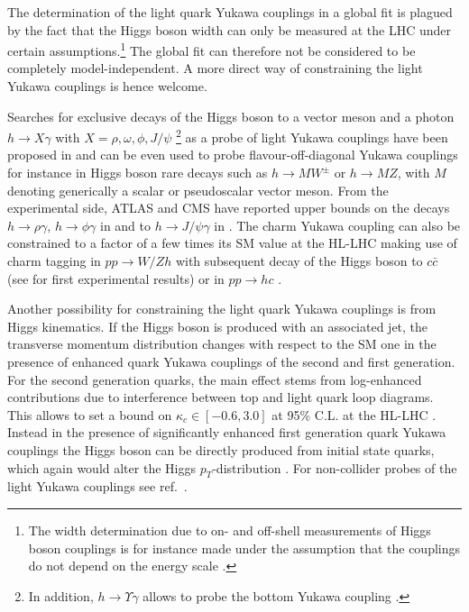 The determination of the light quark Yukawa couplings in a global fit is plagued by the fact  that the Higgs boson width can only be measured at the LHC under certain assumptions.\footnote{The width determination due to on- and off-shell measurements  \cite{Aaboud:2018puo, Sirunyan:2019twz} of Higgs boson couplings \cite{Caola:2013yja} is for instance made under the assumption that the couplings do not depend on the energy scale \cite{Englert:2014aca}.} The global fit can therefore not be considered to be completely model-independent. A more direct way of constraining the light Yukawa couplings is hence welcome.
\par
Searches for exclusive decays of the Higgs boson to a vector meson and a photon $h\to X\gamma $ with $X=\rho, \omega, \phi, J/\psi $ \footnote{In addition, $h\to \Upsilon
	\gamma$ allows to probe the bottom Yukawa coupling \cite{Koenig:2015pha}.}
as a probe of light Yukawa couplings have been proposed in \cite{Bodwin:2013gca}
and can be even used to probe flavour-off-diagonal Yukawa couplings \cite{Kagan:2014ila}
for instance in Higgs boson rare decays such as $h\to M W^{\pm} $ or  $h\to M Z $, with $M$
denoting generically a scalar or pseudoscalar vector meson. From the experimental side,
ATLAS and CMS have reported upper bounds on the decays $h\to \rho \gamma$, $h\to \phi \gamma$ in \cite{Aaboud:2017xnb} and to $h \to J/\psi \gamma $ in \cite{Aaboud:2018txb, Sirunyan:2018fmm}.
The charm Yukawa coupling can also be constrained to a factor of a few times its SM value at the HL-LHC making use of charm tagging in $pp\to W/Zh $ with subsequent decay of the Higgs boson to $c \bar{c}$ \cite{Perez:2015lra} (see \cite{ATL-PHYS-PUB-2018-016, CMS-PAS-HIG-18-031} for first experimental results) or in $pp\to hc$ \cite{Brivio:2015fxa}.
\par
Another possibility for constraining the light quark Yukawa couplings is from Higgs kinematics.  If the Higgs boson is produced with an associated jet, the transverse momentum distribution changes with respect to the SM one in the presence of enhanced quark Yukawa couplings of the second and first generation. For the second generation quarks, the main effect stems from log-enhanced contributions due to interference between top and light quark loop diagrams. This allows to set a bound on $\kappa_c \in [-0.6, 3.0]$  at 95\% C.L. at the HL-LHC \cite{Bishara:2016jga}. Instead in the presence of significantly enhanced first generation quark Yukawa couplings the Higgs boson can be directly produced from initial state quarks, which again would alter the Higgs $p_{T}$-distribution \cite{Soreq:2016rae}. For non-collider probes of the light Yukawa couplings see ref.~\cite{Delaunay:2016brc}.
